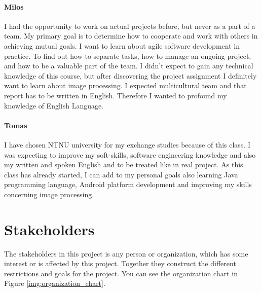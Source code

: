 \paragraph{Milos}

I had the opportunity to work on actual projects before, but never as a part of a team. 
My primary goal is to determine how to cooperate and work with others in achieving mutual goals.
I want to learn about agile software development in practice.
To find out how to separate tasks, how to manage an ongoing project, and how to be a valuable part of the team.
I didn't expect to gain any technical knowledge of this course, but after discovering the project assignment I definitely want to learn about image processing.
I expected multicultural team and that report has to be written in English.
Therefore I wanted to profound my knowledge of English Language.

\paragraph{Tomas}
I have chosen NTNU university for my exchange studies because of this class. 
I was expecting to improve my soft-skills, software engineering knowledge and also my written and spoken English and to be treated like in real project.
As this class has already started, I can add to my personal goals also learning Java programming language,
Android platform development and improving my skills concerning image processing.

\section{Stakeholders}

The stakeholders in this project is any person or organization, which has some interest or is affected by this project. Together they construct the different restrictions and goals for the project. 
You can see the organization chart in Figure \ref{img:organization_chart}.

